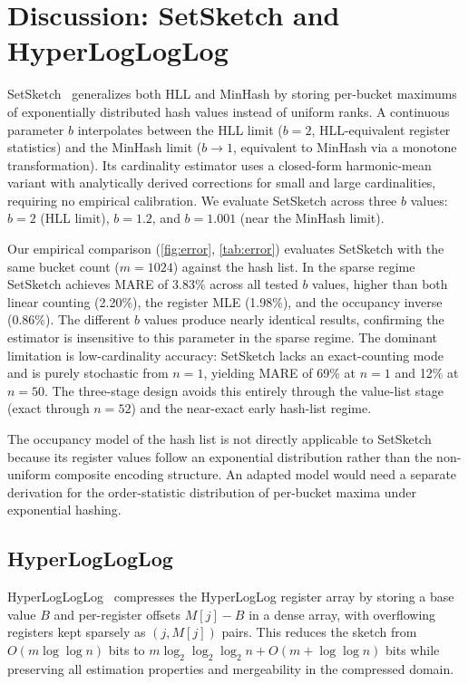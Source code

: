 \documentclass[11pt,letterpaper]{article}
\begin{document}
\section{Discussion: SetSketch and HyperLogLogLog}
\label{sec:discussion}

SetSketch~\cite{ertl2021setsketch} generalizes both HLL and MinHash
by storing per-bucket maximums of exponentially distributed hash
values instead of uniform ranks. A continuous parameter $b$
interpolates between the HLL limit ($b = 2$, HLL-equivalent register
statistics) and the MinHash limit ($b \to 1$, equivalent to MinHash
via a monotone transformation). Its cardinality estimator uses a
closed-form harmonic-mean variant with analytically derived
corrections for small and large cardinalities, requiring no empirical
calibration.
We evaluate SetSketch across three $b$ values: $b = 2$ (HLL limit),
$b = 1.2$, and $b = 1.001$ (near the MinHash limit).

Our empirical comparison (\autoref{fig:error}, \autoref{tab:error})
evaluates SetSketch with the same bucket count ($m = 1024$)
against the hash list. In the sparse regime SetSketch achieves MARE
of 3.83\% across all tested $b$ values, higher than both linear
counting (2.20\%), the register MLE (1.98\%), and the occupancy
inverse (0.86\%). The different $b$ values produce nearly identical
results, confirming the estimator is insensitive to this parameter
in the sparse regime. The dominant limitation is low-cardinality
accuracy: SetSketch lacks an exact-counting mode and is purely
stochastic from $n = 1$, yielding MARE of 69\% at $n = 1$ and
12\% at $n = 50$. The three-stage design avoids this entirely through
the value-list stage (exact through $n = 52$) and the near-exact
early hash-list regime.

The occupancy model of the hash list is not directly applicable
to SetSketch because its register values follow an exponential
distribution rather than the non-uniform composite encoding
structure. An adapted model would need a separate derivation for the
order-statistic distribution of per-bucket maxima under exponential
hashing.

\subsection{HyperLogLogLog}
HyperLogLogLog~\cite{karppa2022hyperlogloglog} compresses the
HyperLogLog register array by storing a base value $B$ and per-register
offsets $M[j] - B$ in a dense array, with overflowing registers kept
sparsely as $(j, M[j])$ pairs. This reduces the sketch from
$O(m \log \log n)$ bits to $m \log_2 \log_2 \log_2 n + O(m + \log \log n)$
bits while preserving all estimation properties and mergeability in
the compressed domain.
\end{document}
